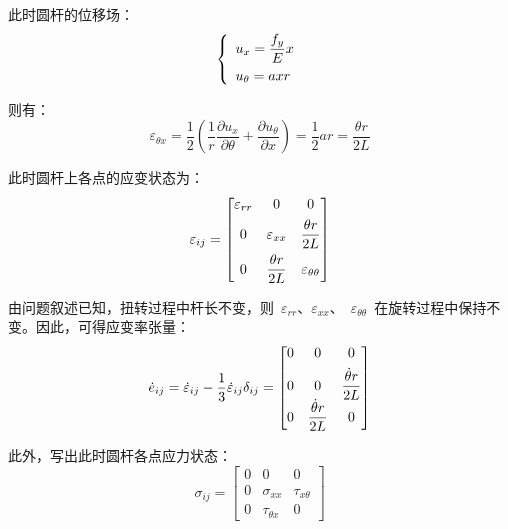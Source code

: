 此时圆杆的位移场：
\begin{equation}\label{eq9}
    \left\{
        \begin{array}{l}
            u_x = \dfrac{f_y}{E}x \vspace{1ex}\\
            u_\theta = axr\\
        \end{array}
    \right.
\end{equation} 

则有：
\begin{equation}\label{eq10}
    \varepsilon_{\theta x} =\dfrac{1}{2}(\dfrac{1}{r}\dfrac{\partial u_x}{\partial \theta}+\dfrac{\partial u_\theta}{\partial x})=\dfrac{1}{2}ar=\dfrac{\theta r}{2L}
\end{equation} 

此时圆杆上各点的应变状态为：
\begin{equation}\label{eq11}
    \varepsilon_{ij} = \begin{bmatrix}
        \varepsilon_{rr} & 0 & 0 \vspace{1ex}\\
        0 & \varepsilon_{xx} & \dfrac{\theta r}{2L} \vspace{1ex}\\
        0 & \dfrac{\theta r}{2L} & \varepsilon_{\theta \theta}
        \end{bmatrix}
\end{equation} 

由问题叙述已知，扭转过程中杆长不变，则~{$\varepsilon_{rr}$}、{$\varepsilon_{xx}$}、~{$\varepsilon_{\theta \theta}$}~在旋转过程中保持不变。因此，可得应变率张量：
\begin{equation}\label{eq12}
    \dot e_{ij} = \dot \varepsilon_{ij} - \dfrac{1}{3}\dot \varepsilon_{ij} \delta_{ij}  = \begin{bmatrix}
        0 & 0 & 0 \vspace{1ex}\\
        0 & 0 & \dfrac{\dot\theta r}{2L}\\
        0 & \dfrac{\dot\theta r}{2L} & 0
        \end{bmatrix}
\end{equation} 

此外，写出此时圆杆各点应力状态：
\begin{equation}\label{eq13}
    \sigma_{ij} = \begin{bmatrix}
        0 & 0 & 0 \\
        0 & \sigma_{xx} & \tau_{x \theta}\\
        0 & \tau_{\theta x} & 0
        \end{bmatrix}
\end{equation} 

